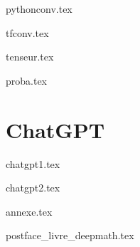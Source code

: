 \documentclass[10pt,twoside,openright]{report}
\begin{document}
{pythonconv.tex}

{tfconv.tex}

{tenseur.tex}

{proba.tex}

\clearemptydoublepage


\part{ChatGPT}

{chatgpt1.tex}

{chatgpt2.tex}


\clearemptydoublepage

{annexe.tex}


{postface_livre_deepmath.tex}

~
\vfill
\bigskip
\bigskip

\end{document}
